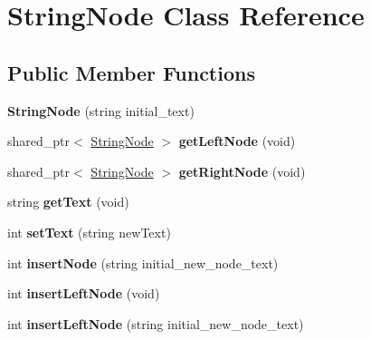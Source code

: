 \hypertarget{classStringNode}{}\section{String\+Node Class Reference}
\label{classStringNode}
\subsection*{Public Member Functions}
\begin{DoxyCompactItemize}
\item 
{\bfseries String\+Node} (string initial\+\_\+text)\hypertarget{classStringNode_a1f3433ce567eebdbb4e6eca97c473893}{}\label{classStringNode_a1f3433ce567eebdbb4e6eca97c473893}

\item 
shared\+\_\+ptr$<$ \hyperlink{classStringNode}{String\+Node} $>$ {\bfseries get\+Left\+Node} (void)\hypertarget{classStringNode_a26959d3dfb7ca6cbad4826dfe27f24f6}{}\label{classStringNode_a26959d3dfb7ca6cbad4826dfe27f24f6}

\item 
shared\+\_\+ptr$<$ \hyperlink{classStringNode}{String\+Node} $>$ {\bfseries get\+Right\+Node} (void)\hypertarget{classStringNode_a3803fff2b8a3ca379fbfc1535d882fbd}{}\label{classStringNode_a3803fff2b8a3ca379fbfc1535d882fbd}

\item 
string {\bfseries get\+Text} (void)\hypertarget{classStringNode_a43dce00f3299da71994d88ac0d3c48ee}{}\label{classStringNode_a43dce00f3299da71994d88ac0d3c48ee}

\item 
int {\bfseries set\+Text} (string new\+Text)\hypertarget{classStringNode_aa87f867d5e9ba8f8263afe8b32cd1df8}{}\label{classStringNode_aa87f867d5e9ba8f8263afe8b32cd1df8}

\item 
int {\bfseries insert\+Node} (string initial\+\_\+new\+\_\+node\+\_\+text)\hypertarget{classStringNode_a0496eef4a3ff3c8134ba1ce2e1f01804}{}\label{classStringNode_a0496eef4a3ff3c8134ba1ce2e1f01804}

\item 
int {\bfseries insert\+Left\+Node} (void)\hypertarget{classStringNode_a9deca96372ae91bea728cc9ff5236441}{}\label{classStringNode_a9deca96372ae91bea728cc9ff5236441}

\item 
int {\bfseries insert\+Left\+Node} (string initial\+\_\+new\+\_\+node\+\_\+text)\hypertarget{classStringNode_a4199a842393aa4d98c3695858b097128}{}\label{classStringNode_a4199a842393aa4d98c3695858b097128}


\end{DoxyCompactItemize}
